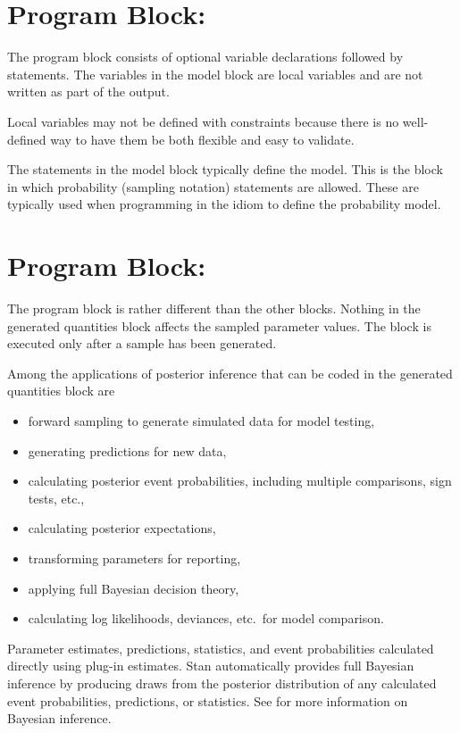 \section{Program Block: }

The  program block consists of optional variable
declarations followed by statements.  The variables in the model block
are local variables and are not written as part of the output.

Local variables may not be defined with constraints because there is
no well-defined way to have them be both flexible and easy to
validate.

The statements in the model block typically define the model.  This is
the block in which probability (sampling notation) statements are
allowed.  These are typically used when programming in the \BUGS idiom
to define the probability model.


\section{Program Block: }

The  program block is rather different than
the other blocks.  Nothing in the generated quantities block affects
the sampled parameter values.  The block is executed only after a
sample has been generated.

Among the applications of posterior inference that can be coded in the
generated quantities block are
%
\begin{itemize}
\item forward sampling to generate simulated data for model testing,
\item generating predictions for new data,
\item calculating posterior event probabilities, including multiple comparisons,
  sign tests, etc.,
\item calculating posterior expectations,
\item transforming parameters for reporting,
\item applying full Bayesian decision theory,
\item calculating log likelihoods, deviances, etc.\ for model comparison.
\end{itemize}
%
Parameter estimates, predictions, statistics, and event probabilities
calculated directly using plug-in estimates.  Stan automatically
provides full Bayesian inference by producing draws from the
posterior distribution of any calculated event probabilities,
predictions, or statistics.  See  for more
information on Bayesian inference.

